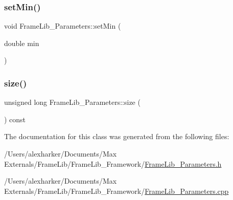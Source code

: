 \mbox{\label{class_frame_lib___parameters_ad3ade0db8b31a6cc85f4b66b6ad94cca}} 
\subsubsection{\texorpdfstring{set\+Min()}{setMin()}}
{\footnotesize\ttfamily void Frame\+Lib\+\_\+\+Parameters\+::set\+Min (\begin{DoxyParamCaption}\item[{double}]{min }\end{DoxyParamCaption})\hspace{0.3cm}{\ttfamily [inline]}}

\mbox{\label{class_frame_lib___parameters_a391d0cb37c904981f7ad52bc0ba1b111}} 
\subsubsection{\texorpdfstring{size()}{size()}}
{\footnotesize\ttfamily unsigned long Frame\+Lib\+\_\+\+Parameters\+::size (\begin{DoxyParamCaption}{ }\end{DoxyParamCaption}) const\hspace{0.3cm}{\ttfamily [inline]}}



The documentation for this class was generated from the following files\+:\begin{DoxyCompactItemize}
\item 
/\+Users/alexharker/\+Documents/\+Max Externals/\+Frame\+Lib/\+Frame\+Lib\+\_\+\+Framework/\hyperlink{_frame_lib___parameters_8h}{Frame\+Lib\+\_\+\+Parameters.\+h}\item 
/\+Users/alexharker/\+Documents/\+Max Externals/\+Frame\+Lib/\+Frame\+Lib\+\_\+\+Framework/\hyperlink{_frame_lib___parameters_8cpp}{Frame\+Lib\+\_\+\+Parameters.\+cpp}\end{DoxyCompactItemize}
